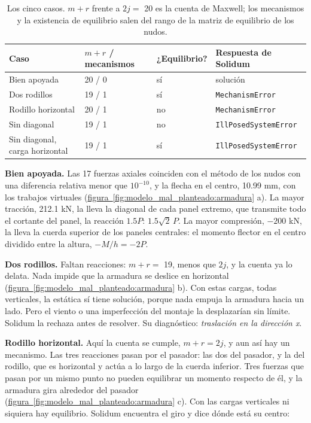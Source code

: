 \documentclass[11pt,oneside]{report}
\begin{document}
\begin{table}[h]
\centering
\caption{Los cinco casos. $m + r$ frente a $2j =$ 20 es la cuenta de Maxwell; los mecanismos y la existencia de equilibrio salen del rango de la matriz de equilibrio de los nudos.}
\begin{tabularx}{\textwidth}{YYYY}
\hline
\textbf{Caso} & \textbf{$m + r$ / mecanismos} & \textbf{¿Equilibrio?} & \textbf{Respuesta de Solidum} \\
\hline
Bien apoyada & 20 / 0 & sí & solución \\
Dos rodillos & 19 / 1 & sí & \texttt{MechanismError} \\
Rodillo horizontal & 20 / 1 & no & \texttt{MechanismError} \\
Sin diagonal & 19 / 1 & no & \texttt{IllPosedSystemError} \\
Sin diagonal, carga horizontal & 19 / 1 & sí & \texttt{IllPosedSystemError} \\
\hline
\end{tabularx}
\end{table}
\textbf{Bien apoyada.} Las 17 fuerzas axiales coinciden con el método de los nudos con una diferencia relativa menor que $10^{-10}$, y la flecha en el centro, 10.99 mm, con los trabajos virtuales (\hyperref[fig:modelo_mal_planteado:armadura]{figura~\ref*{fig:modelo_mal_planteado:armadura}} a). La mayor tracción, 212.1 kN, la lleva la diagonal de cada panel extremo, que transmite todo el cortante del panel, la reacción $1.5P$: $1.5\sqrt 2\,P$. La mayor compresión, $-200$ kN, la lleva la cuerda superior de los paneles centrales: el momento flector en el centro dividido entre la altura, $-M/h = -2P$.

\textbf{Dos rodillos.} Faltan reacciones: $m + r =$ 19, menos que $2j$, y la cuenta ya lo delata. Nada impide que la armadura se deslice en horizontal (\hyperref[fig:modelo_mal_planteado:armadura]{figura~\ref*{fig:modelo_mal_planteado:armadura}} b). Con estas cargas, todas verticales, la estática sí tiene solución, porque nada empuja la armadura hacia un lado. Pero el viento o una imperfección del montaje la desplazarían sin límite. Solidum la rechaza antes de resolver. Su diagnóstico: \textit{traslación en la dirección x}.

\textbf{Rodillo horizontal.} Aquí la cuenta se cumple, $m + r = 2j$, y aun así hay un mecanismo. Las tres reacciones pasan por el pasador: las dos del pasador, y la del rodillo, que es horizontal y actúa a lo largo de la cuerda inferior. Tres fuerzas que pasan por un mismo punto no pueden equilibrar un momento respecto de él, y la armadura gira alrededor del pasador (\hyperref[fig:modelo_mal_planteado:armadura]{figura~\ref*{fig:modelo_mal_planteado:armadura}} c). Con las cargas verticales ni siquiera hay equilibrio. Solidum encuentra el giro y dice dónde está su centro:
\end{document}
